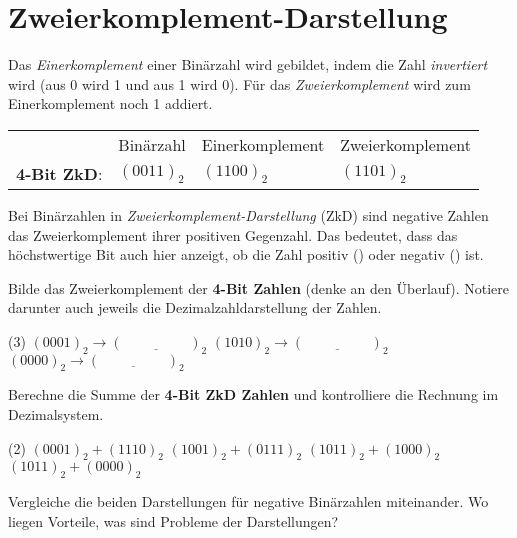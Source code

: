 \documentclass[9pt, a4paper]{arbeitsblatt}
\newcommand{\luecke}[1]{\underline{\hspace{#1}}}
\begin{document}
\section*{Zweierkomplement-Darstellung}
\begin{infobox}
Das \emph{Einerkomplement} einer Binärzahl wird gebildet, indem die Zahl \emph{invertiert} wird (aus 0 wird 1 und aus 1 wird 0). Für das \emph{Zweierkomplement} wird zum Einerkomplement noch 1 addiert.

\begin{tabularx}{\textwidth}{XXXX}
	 & Binärzahl & Einerkomplement & Zweierkomplement \\
	\textbf{4-Bit ZkD}: & $(0011)_2$ & $(1100)_2$ & $(1101)_2$
\end{tabularx}

Bei Binärzahlen in \emph{Zweierkomplement-Darstellung} (ZkD) sind negative Zahlen das Zweierkomplement ihrer positiven Gegenzahl. Das bedeutet, dass das höchstwertige Bit auch hier anzeigt, ob die Zahl positiv () oder negativ () ist.
\end{infobox}

\begin{aufgabe}
	Bilde das Zweierkomplement der \textbf{4-Bit Zahlen} (denke an den Überlauf). Notiere darunter auch jeweils die Dezimalzahldarstellung der Zahlen.

	\begin{tasks}(3)
		\task $(0001)_2 \longrightarrow (\luecke{2cm})_2$
		\task $(1010)_2 \longrightarrow (\luecke{2cm})_2$
		\task $(0000)_2 \longrightarrow (\luecke{2cm})_2$
	\end{tasks}
\end{aufgabe}

\begin{aufgabe}
	Berechne die Summe der \textbf{4-Bit ZkD Zahlen} und kontrolliere die Rechnung im Dezimalsystem.

	\begin{tasks}(2)
		\task $(0001)_2 + (1110)_2$
		\task $(1001)_2 + (0111)_2$
		\task $(1011)_2 + (1000)_2$
		\task $(1011)_2 + (0000)_2$
	\end{tasks}
\end{aufgabe}

\begin{aufgabe}
	Vergleiche die beiden Darstellungen für negative Binärzahlen miteinander. Wo liegen Vorteile, was sind Probleme der Darstellungen?
\end{aufgabe}
\end{document}
